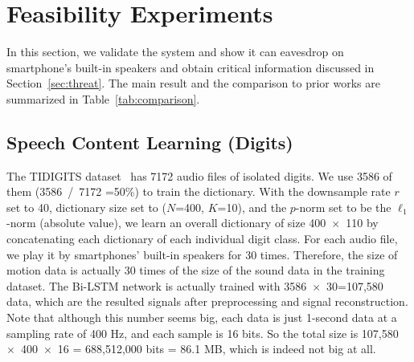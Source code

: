 
\section{Feasibility Experiments }\label{sec:experiment}


In this section, we validate the {\systemName} system and show it can eavesdrop on smartphone's built-in speakers and obtain critical information discussed in Section~\ref{sec:threat}. The main result and the  comparison  to prior works are summarized in  Table~\ref{tab:comparison}. 



\subsection{Speech Content Learning   (Digits)}

The TIDIGITS dataset~\cite{leonard1993tidigits} has 7172 audio files of isolated digits.  We use 3586 of them (3586~/~7172 =50\%) to train the dictionary. With the downsample rate $r$ set to 40, dictionary size set to ($N$=400, $K$=10), and the $p$-norm set to be the $\ell_1$-norm (absolute value), we learn an overall  dictionary of size 400~$\times$~110 by concatenating each dictionary of each individual digit class. 
%
For each audio file, we play it by smartphones' built-in speakers for 30 times. Therefore, the size of motion data is actually 30 times of the size of the sound data in the training dataset.  The Bi-LSTM network is actually trained with 3586~$\times$~30=107,580 data, which are the resulted signals after preprocessing and signal reconstruction. Note that although this number seems big, each data is just 1-second data at a sampling rate of 400 Hz,  and each sample is 16 bits. So the total size is 107,580~$\times$~400~$\times$~16 = 688,512,000 bits = 86.1 MB, which is indeed not big at all.

